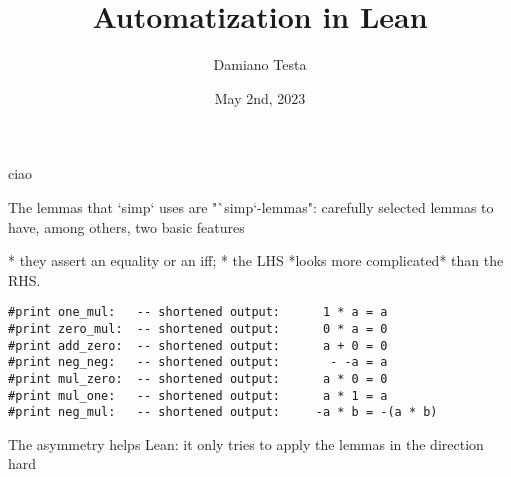 \documentclass{beamer}
\title{Automatization in Lean}
\author{Damiano Testa}
\institute{University of Warwick}
\date{May 2nd, 2023}
\begin{document}
%



%


\frame{\titlepage}

\begin{frame}[fragile]{ciao}


The lemmas that `simp` uses are "`simp`-lemmas": carefully selected lemmas to have, among others, two basic features

* they assert an equality or an iff;
* the LHS *looks more complicated* than the RHS.

\begin{verbatim}
#print one_mul:   -- shortened output:      1 * a = a
#print zero_mul:  -- shortened output:      0 * a = 0
#print add_zero:  -- shortened output:      a + 0 = 0
#print neg_neg:   -- shortened output:       - -a = a
#print mul_zero:  -- shortened output:      a * 0 = 0
#print mul_one:   -- shortened output:      a * 1 = a
#print neg_mul:   -- shortened output:     -a * b = -(a * b)
\end{verbatim}

The asymmetry helps Lean: it only tries to apply the lemmas in the direction hard %


\end{frame}
\end{document}
